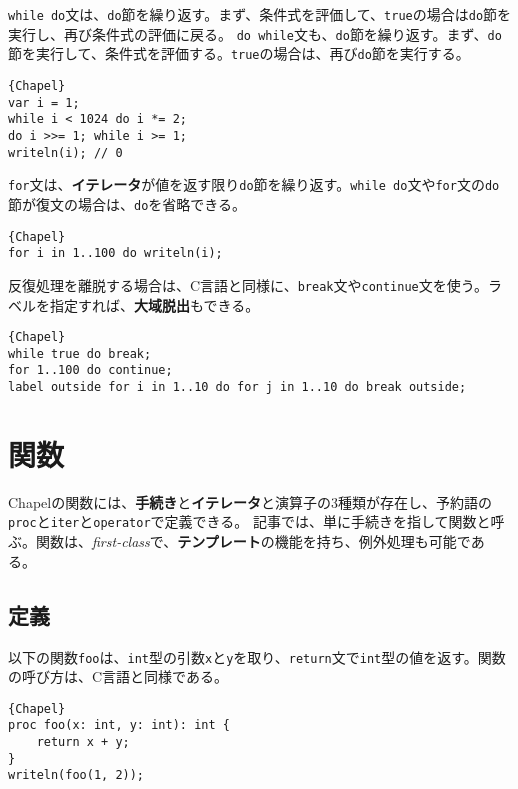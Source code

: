 \documentclass[10pt,a4paper]{book}
\begin{document}
\texttt{while do}文は、\texttt{do}節を繰り返す。まず、条件式を評価して、\texttt{true}の場合は\texttt{do}節を実行し、再び条件式の評価に戻る。
\texttt{do while}文も、\texttt{do}節を繰り返す。まず、\texttt{do}節を実行して、条件式を評価する。\texttt{true}の場合は、再び\texttt{do}節を実行する。

\begin{Verbatim}{Chapel}
var i = 1;
while i < 1024 do i *= 2;
do i >>= 1; while i >= 1;
writeln(i); // 0
\end{Verbatim}

\texttt{for}文は、\textbf{イテレータ}が値を返す限り\texttt{do}節を繰り返す。\texttt{while do}文や\texttt{for}文の\texttt{do}節が復文の場合は、\texttt{do}を省略できる。

\begin{Verbatim}{Chapel}
for i in 1..100 do writeln(i);
\end{Verbatim}

反復処理を離脱する場合は、C言語と同様に、\texttt{break}文や\texttt{continue}文を使う。ラベルを指定すれば、\textbf{大域脱出}もできる。

\begin{Verbatim}{Chapel}
while true do break;
for 1..100 do continue;
label outside for i in 1..10 do for j in 1..10 do break outside;
\end{Verbatim}

\chapter{関数\label{chap:proc}}

Chapelの関数には、\textbf{手続き}と\textbf{イテレータ}と演算子の3種類が存在し、予約語の\texttt{proc}と\texttt{iter}と\texttt{operator}で定義できる。
記事では、単に手続きを指して関数と呼ぶ。関数は、\textit{first-class}で、\textbf{テンプレート}の機能を持ち、例外処理も可能である。

\section{定義}

以下の関数\texttt{foo}は、\texttt{int}型の引数\texttt{x}と\texttt{y}を取り、\texttt{return}文で\texttt{int}型の値を返す。関数の呼び方は、C言語と同様である。

\begin{Verbatim}{Chapel}
proc foo(x: int, y: int): int {
	return x + y;
}
writeln(foo(1, 2));
\end{Verbatim}
\end{document}
